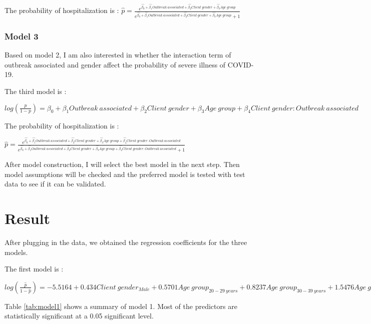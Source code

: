 \documentclass[
]{article}
\begin{document}
The probability of hospitalization is :
\(\hat{p}=\frac{e^{\hat{\beta_0}+ \hat{\beta_1}Outbreak \ associated + \hat{\beta_2}Client \ gender +\hat{\beta_3}Age \ group}}{e^{\hat{\beta_0} + \hat{\beta_1}Outbreak \ associated + \hat{\beta_2}Client \ gender + \hat{\beta_3}Age \ group}+1}\)

\hypertarget{model-3}{%
\subsubsection{Model 3}\label{model-3}}

Based on model 2, I am also interested in whether the interaction term of outbreak associated and gender affect the probability of severe illness of COVID-19.

The third model is :

\(log(\frac{p}{1-p}) = \beta_0 + \beta_1Outbreak \ associated + \beta_2Client \ gender + \beta_3Age \ group +\beta_4Client \ gender:Outbreak \ associated\)

The probability of hospitalization is :

\(\hat{p}=\frac{e^{\hat{\beta_0}+ \hat{\beta_1}Outbreak \ associated + \hat{\beta_2}Client \ gender +\hat{\beta_3}Age \ group+\hat{\beta_4}Client \ gender:Outbreak \ associated}}{e^{\hat{\beta_0} + \hat{\beta_1}Outbreak \ associated + \hat{\beta_2}Client \ gender + \hat{\beta_3}Age \ group+\hat{\beta_4}Client \ gender:Outbreak \ associated}+1}\)

After model construction, I will select the best model in the next step. Then model assumptions will be checked and the preferred model is tested with test data to see if it can be validated.

\hypertarget{result}{%
\section{Result}\label{result}}

After plugging in the data, we obtained the regression coefficients for the three models.

The first model is :

\(log(\frac{\hat{p}}{1-\hat{p}}) = -5.5164+0.434Client \ gender_{Male} + 0.5701Age \ group_{20-29 \ years}+0.8237Age \ group_{30-39 \ years}+1.5476Age \ group_{40-49 \ years} +2.0775Age \ group_{50-59 \ years} +3.0685Age \ group_{60-69 \ years} +4.2582Age \ group_{70-79 \ years}+4.6742Age \ group_{80-89 \ years} +4.4333Age \ group_{90 +}\)

Table \ref{tab:model1} shows a summary of model 1. Most of the predictors are statistically significant at a 0.05 significant level.
\end{document}
